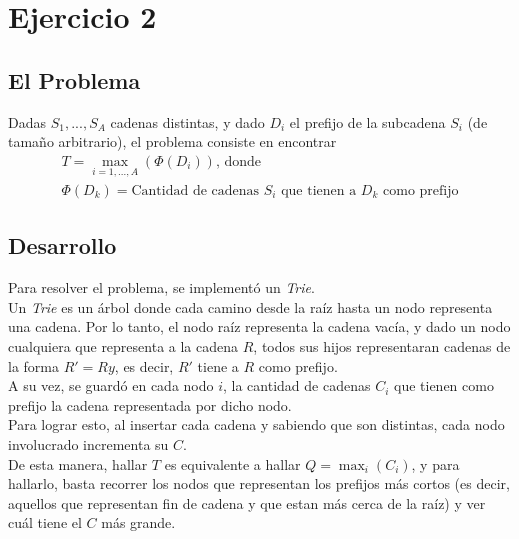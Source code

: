 \section{Ejercicio 2}
\subsection{El Problema}
Dadas $S_1,...,S_A$ cadenas distintas, y dado $D_i$ el prefijo de la subcadena $S_i$ (de tamaño arbitrario), el problema consiste en encontrar 
\begin{gather*}
T = \operatorname*{max}_{i = 1,...,A} (\Phi(D_i))\text{, donde}\\
\Phi(D_k) = \text{Cantidad de cadenas $S_i$ que tienen a $D_k$ como prefijo}
\end{gather*}

\subsection{Desarrollo}
Para resolver el problema, se implementó un \emph{Trie}.\\
Un \emph{Trie} es un árbol donde cada camino desde la raíz hasta un nodo representa una cadena. Por lo tanto, el nodo raíz representa la cadena vacía, y dado un nodo cualquiera que representa a la cadena $R$, todos sus hijos representaran cadenas de la forma $R' = Ry$, es decir, $R'$ tiene a $R$ como prefijo.\\
A su vez, se guardó en cada nodo $i$, la cantidad de cadenas $C_i$ que tienen como prefijo la cadena representada por dicho nodo.\\
Para lograr esto, al insertar cada cadena y sabiendo que son distintas, cada nodo involucrado incrementa su $C$.\\
De esta manera, hallar $T$ es equivalente a hallar $\displaystyle Q = \operatorname*{max}_{i} (C_i)$, y para hallarlo, basta recorrer los nodos que representan los prefijos más cortos (es decir, aquellos que representan fin de cadena y que estan más cerca de la raíz) y ver cuál tiene el $C$ más grande.

